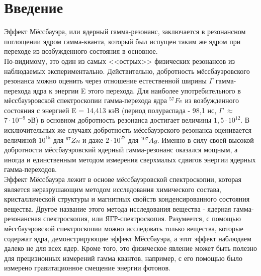 \documentclass{article}
\begin{document}
\section{Введение}
\hspace{12pt} Эффект Мёссбауэра, или ядерный гамма-резонанс, заключается в резонансном поглощении ядром гамма-кванта, который был испущен таким же ядром при переходе из возбужденного состояния в основное.
\\
\indent По-видимому, это один из самых <<острых>> физических резонансов из наблюдаемых экспериментально. Действительно, добротность мёссбауэровского резонанса можно оценить через отношение естественной ширины $\Gamma$ 
гамма-перехода ядра к энергии E этого перехода. Для наиболее употребительного в мёссбауэровской спектроскопии гамма-перехода ядра $^{57}Fe$ из возбужденного состояния с энергией E = 14,413 кэВ (период полураспада - 98,1 нс, $\Gamma$ $\approx$ $7\cdot 10^{-9}$ эВ) в основном добротность резонанса достигает величины $1,5\cdot 10^{12}$. В исключительных же случаях добротность мёссбауэрского резонанса оценивается величиной $10^{15}$ для $^{67}Zn$ и даже  $2\cdot 10^{22}$ для $^{107}Ag$. Именно в силу своей высокой добротности мёссбауэровский ядерный гамма-резонанс оказался мощным, а иногда и единственным методом измерения сверхмалых сдвигов энергии ядерных гамма-переходов.
\\
\indent Эффект Мёссбауэра лежит в основе мёссбауэровской спектроскопии, которая является неразрушающим методом исследования химического состава, кристаллической структуры и магнитных свойств конденсированного состояния вещества. Другое название этого метода исследования вещества - ядерная гамма-резонансная спектроскопия, или ЯГР-спектроскопия. Разумеется, с помощью мёссбауэровской спектроскопии можно исследовать только вещества, которые содержат ядра, демонстрирующие эффект Мёссбауэра, а этот эффект наблюдаем далеко не для всех ядер. Кроме того, это физическое явление может быть полезно для прецизионных измерений гамма квантов, например, с его помощью было измерено гравитационное смещение энергии фотонов.
\end{document}

